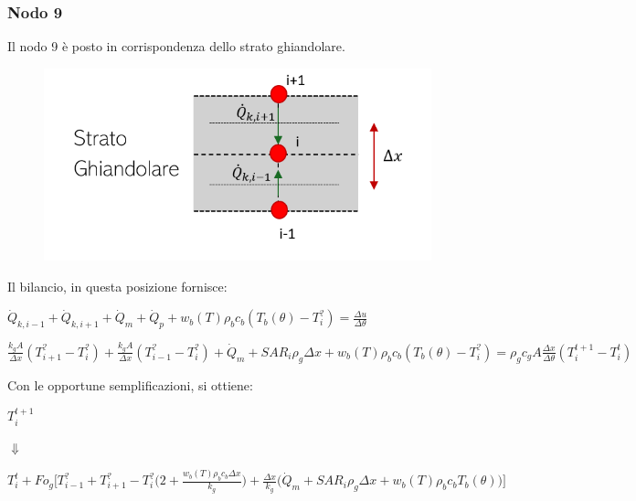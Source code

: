 \subsubsection*{Nodo 9}
Il nodo 9 è posto in corrispondenza dello strato ghiandolare.\\
\begin{figure}[H]
    \centering
    \includegraphics[width=.6\textwidth]{Immagini/Nodi/nodo9.png} 
    \label{nodo9}
\end{figure}
\noindent
Il bilancio, in questa posizione fornisce:
\begin{center}
	$ \Dot{Q} _{k, i-1} +\Dot{Q} _{k, i+1}+ \Dot{Q} _{m} +\Dot{Q} _{p}+ w_b (T) \rho _b c_b (T_b(\theta)-T_i ^?)= \frac{\Delta u}{\Delta \theta} $
\end{center}
\vspace{0.15cm}
\begin{center}
	$ \frac{k_{g} A }{\Delta x}(T_{i+1} ^? - T_i ^? ) + \frac{k_g A }{\Delta x}(T_{i-1} ^? - T_i ^? )+ \Dot{Q} _{m} + SAR_i\rho _g \Delta x + w_b (T) \rho _b c_b (T_b(\theta)-T_i ^?) = \rho _{g} c_{g} A \frac{\Delta x}{ \Delta \theta}(T_i ^{t+1} - T_i ^t ) $
\end{center}
Con le opportune semplificazioni, si ottiene:
\begin{center}
	$T_i ^{t+1} $
\end{center}
\begin{center}
	$\Downarrow$
\end{center}
\begin{center}
	$T_i ^t + Fo_{g} \Bigg[ T_{i-1} ^? + T_{i+1} ^?- T_i ^? \Big(2 + \frac{ w_b (T) \rho _b c_b \Delta x }{k_{g}} \Big) + \frac{\Delta x }{k_{g}} \Big(\Dot{Q} _{m} +  SAR_i \rho _{g} \Delta x + w_b (T) \rho _b c_b T_b(\theta)\Big) \Bigg]$
\end{center}






